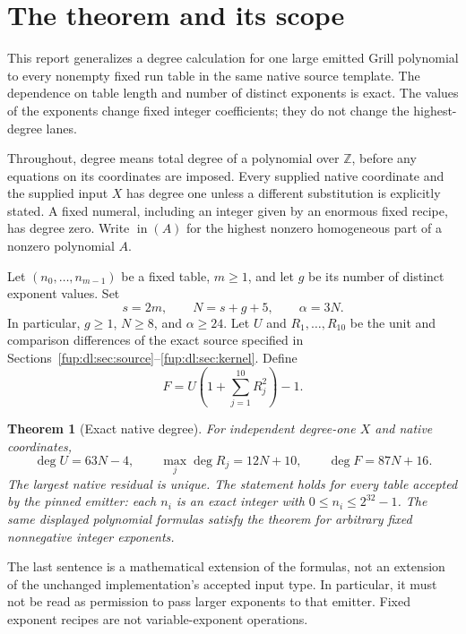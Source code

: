 \documentclass[11pt,letterpaper]{article}
\newtheorem{theorem}{Theorem}[section]
\theoremstyle{definition}\newtheorem{definition}[theorem]{Definition}
\theoremstyle{remark}\newtheorem{remark}[theorem]{Remark}
\newcommand{\Z}{\mathbb Z}\newcommand{\Np}{\mathbb Z_{>0}}
\newcommand{\topf}[1]{\operatorname{in}(#1)}
\begin{document}
\section{The theorem and its scope}\label{fup:dl:sec:main}
This report generalizes a degree calculation for one large emitted Grill polynomial to every nonempty fixed run table in the same native source template. The dependence on table length and number of distinct exponents is exact. The values of the exponents change fixed integer coefficients; they do not change the highest-degree lanes.

Throughout, degree means total degree of a polynomial over $\Z$, before any equations on its coordinates are imposed. Every supplied native coordinate and the supplied input $X$ has degree one unless a different substitution is explicitly stated. A fixed numeral, including an integer given by an enormous fixed recipe, has degree zero. Write $\topf{A}$ for the highest nonzero homogeneous part of a nonzero polynomial $A$.

Let $(n_0,\ldots,n_{m-1})$ be a fixed table, $m\ge1$, and let $g$ be its number of distinct exponent values. Set
\begin{equation}\label{fup:dl:eq:parameters}
 s=2m,\qquad N=s+g+5,\qquad \alpha=3N.
\end{equation}
In particular, $g\ge1$, $N\ge8$, and $\alpha\ge24$. Let $U$ and $R_1,\ldots,R_{10}$ be the unit and comparison differences of the exact source specified in Sections~\ref{fup:dl:sec:source}--\ref{fup:dl:sec:kernel}. Define
\begin{equation}\label{fup:dl:eq:native}
 F=U\left(1+\sum_{j=1}^{10}R_j^2\right)-1.
\end{equation}

\begin{theorem}[Exact native degree]\label{fup:dl:thm:native}
For independent degree-one $X$ and native coordinates,
\[
 \deg U=63N-4,\qquad \max_j\deg R_j=12N+10,
 \qquad \boxed{\deg F=87N+16}.
\]
The largest native residual is unique. The statement holds for every table accepted by the pinned emitter: each $n_i$ is an exact integer with $0\le n_i\le2^{32}-1$. The same displayed polynomial formulas satisfy the theorem for arbitrary fixed nonnegative integer exponents.
\end{theorem}

The last sentence is a mathematical extension of the formulas, not an extension of the unchanged implementation's accepted input type. In particular, it must not be read as permission to pass larger exponents to that emitter. Fixed exponent recipes are not variable-exponent operations.
\end{document}
